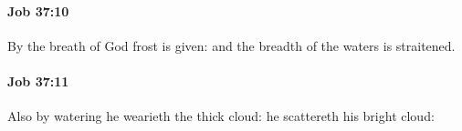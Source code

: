 		\paragraph{Job 37:10} %
			\label{JOB-37-10}

			By the breath of God frost is given: and the breadth of the waters is straitened.


		\paragraph{Job 37:11} %
			\label{JOB-37-11}

			Also by watering he wearieth the thick cloud: he scattereth his bright cloud:


